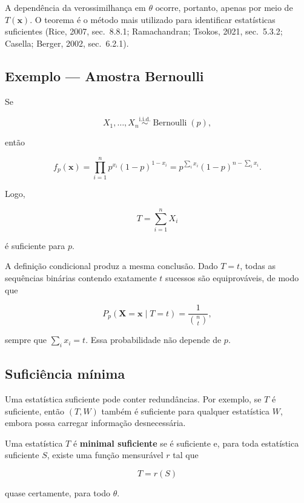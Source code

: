 \documentclass[
  letterpaper,
  DIV=11,
  numbers=noendperiod]{scrreprt}
\begin{document}
A dependência da verossimilhança em \(\theta\) ocorre, portanto, apenas
por meio de \(T(\mathbf{x})\). O teorema é o método mais utilizado para
identificar estatísticas suficientes (Rice, 2007, sec.~8.8.1;
Ramachandran; Tsokos, 2021, sec.~5.3.2; Casella; Berger, 2002,
sec.~6.2.1).

\subsection*{Exemplo --- Amostra
Bernoulli}\label{exemplo-amostra-bernoulli}

Se

\[X_1,\ldots,X_n
\overset{\mathrm{i.i.d.}}{\sim}
\operatorname{Bernoulli}(p),\]

então

\[f_p(\mathbf{x})
=
\prod_{i=1}^n
p^{x_i}(1-p)^{1-x_i}
=
p^{\sum_i x_i}(1-p)^{n-\sum_i x_i}.\]

Logo,

\[T=\sum_{i=1}^nX_i\]

é suficiente para \(p\).

A definição condicional produz a mesma conclusão. Dado \(T=t\), todas as
sequências binárias contendo exatamente \(t\) sucessos são
equiprováveis, de modo que

\[P_p\left(
\mathbf{X}=\mathbf{x}\mid T=t
\right)
=
\frac{1}{\binom{n}{t}},\]

sempre que \(\sum_i x_i=t\). Essa probabilidade não depende de \(p\).

\subsection*{Suficiência mínima}\label{suficiuxeancia-muxednima}

Uma estatística suficiente pode conter redundâncias. Por exemplo, se
\(T\) é suficiente, então \((T,W)\) também é suficiente para qualquer
estatística \(W\), embora possa carregar informação desnecessária.

\begin{tcolorbox}[enhanced jigsaw, colback=white, leftrule=.75mm, colbacktitle=quarto-callout-important-color!10!white, breakable, titlerule=0mm, bottomtitle=1mm, title=\textcolor{quarto-callout-important-color}{\faExclamation}\hspace{0.5em}{Definição --- Estatística minimal suficiente}, colframe=quarto-callout-important-color-frame, toprule=.15mm, opacityback=0, bottomrule=.15mm, opacitybacktitle=0.6, arc=.35mm, toptitle=1mm, rightrule=.15mm, coltitle=black, left=2mm]

Uma estatística \(T\) é \textbf{minimal suficiente} se é suficiente e,
para toda estatística suficiente \(S\), existe uma função mensurável
\(r\) tal que

\[T=r(S)\]

quase certamente, para todo \(\theta\).

\end{tcolorbox}
\end{document}
